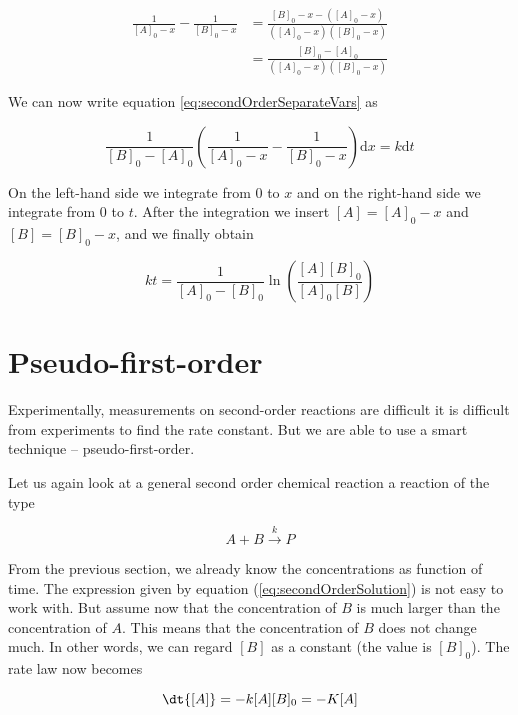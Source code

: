 \begin{align*}
  \frac{1}{[A]_0 - x} - \frac{1}{[B]_0 - x} &= \frac{[B]_0 - x - ([A]_0 - x)}{([A]_0 - x)([B]_0 - x)} \\
    &= \frac{[B]_0 - [A]_0}{([A]_0 - x)([B]_0 - x)}
\end{align*}

We can now write equation \ref{eq:secondOrderSeparateVars} as

\begin{equation}
  \frac{1}{[B]_0 - [A]_0} \left( \frac{1}{[A]_0 - x} - \frac{1}{[B]_0 - x} \right) \mathrm{d}x = k\mathrm{d}t
\end{equation}

On the left-hand side we integrate from $0$ to $x$ and on the right-hand side we integrate from $0$ to $t$. After the integration we insert $[A] = [A]_0 - x$ and $[B] = [B]_0 - x$, and we finally obtain

\begin{equation}
  \label{eq:secondOrderSolution}
  kt = \frac{1}{[A]_0 - [B]_0} \ln\left(\frac{[A][B]_0}{[A]_0[B]}\right)
\end{equation}

\section{Pseudo-first-order}
\label{sect:PseudoFirstOrder}

Experimentally, measurements on second-order reactions are difficult \ie it is difficult from experiments to find the rate constant. But we are able to use a smart technique -- pseudo-first-order.

Let us again look at a general second order chemical reaction \ie a reaction of the type

\begin{equation}
  A + B \overset{k}{\rightarrow} P
\end{equation}

From the previous section, we already know the concentrations as function of time. The expression given by equation (\ref{eq:secondOrderSolution}) is not easy to work with. But assume now that the concentration of $B$ is much larger than the concentration of $A$. This means that the concentration of $B$ does not change much. In other words, we can regard $[B]$ as a constant (the value is $[B]_0$). The rate law now becomes

\begin{equation}
  \dt{[A]} = -k[A][B]_0 = -K[A]
\end{equation}

